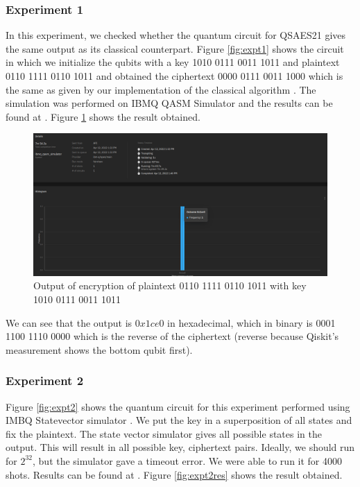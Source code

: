 \documentclass[preprint]{transcrypto}
\begin{document}
\subsubsection{Experiment 1}
In this experiment, we checked whether the quantum circuit for QSAES21 gives the same output as its classical counterpart. Figure \ref{fig:expt1} shows the circuit in which we initialize the qubits with a key 1010 0111 0011 1011 and plaintext 0110 1111 0110 1011 and obtained the ciphertext 0000 0111 0011 1000 which is the same as given by our implementation of the classical algorithm \cite{Gopal}. The simulation was performed on IBMQ QASM Simulator \cite{IBMQ} and the results can be found at \cite{Gopal}. Figure \ref{fig:expt1res} shows the result obtained.

\begin{figure}[h!]
    \centering
    \includegraphics[width=\linewidth]{saes21/encryption.png}
    \caption{Output of encryption of plaintext 0110 1111 0110 1011 with key 1010 0111 0011 1011}
    \label{fig:expt1res}
\end{figure}

We can see that the output is $0x1ce0$ in hexadecimal, which in binary is 0001 1100 1110 0000 which is the reverse of the ciphertext (reverse because Qiskit's \cite{Qiskit} measurement shows the bottom qubit first). 


\subsubsection{Experiment 2}
Figure \ref{fig:expt2} shows the quantum circuit for this experiment performed using IMBQ Statevector simulator \cite{IBMQ}. We put the key in a superposition of all states and fix the plaintext. The state vector simulator gives all possible states in the output. This will result in all possible key, ciphertext pairs. Ideally, we should run for $2^{32}$, but the simulator gave a timeout error. We were able to run it for 4000 shots. Results can be found at \cite{Gopal}.  Figure \ref{fig:expt2res} shows the result obtained.
\end{document}
